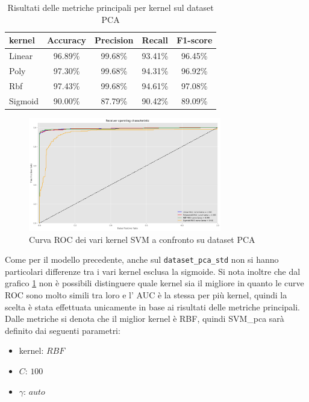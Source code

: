 \begin{table}[!ht]
    \centering
    \begin{tabular}{@{}lcccc@{}}
        \toprule
        \rowcolor[HTML]{EFEFEF}
        \textbf{kernel}                                                &
        \multicolumn{1}{l}{\cellcolor[HTML]{EFEFEF}\textbf{Accuracy}}  &
        \multicolumn{1}{l}{\cellcolor[HTML]{EFEFEF}\textbf{Precision}} &
        \multicolumn{1}{l}{\cellcolor[HTML]{EFEFEF}\textbf{Recall}}    &
        \multicolumn{1}{l}{\cellcolor[HTML]{EFEFEF}\textbf{F1-score}}                                          \\ \midrule
        Linear                                                         & 96.89\% & 99.68\% & 93.41\% & 96.45\% \\
        Poly                                                           & 97.30\% & 99.68\% & 94.31\% & 96.92\% \\
        Rbf                                                            & 97.43\% & 99.68\% & 94.61\% & 97.08\% \\
        Sigmoid                                                        & 90.00\% & 87.79\% & 90.42\% & 89.09\% \\ \bottomrule
    \end{tabular}
    \caption{Risultati delle metriche principali per kernel sul dataset PCA}
    \label{tab:top_metrics_kernels_pca}
\end{table}

\begin{figure}[!ht]
    \centering
    \includegraphics[width=0.75\textwidth]{img/svm/SVM_roc_pca.png}
    \caption{Curva ROC dei vari kernel SVM a confronto su dataset PCA}
    \label{fig:roc_SVM_PCA}
\end{figure}

Come per il modello precedente, anche sul \texttt{dataset\_pca\_std} non si hanno particolari
differenze tra i vari kernel esclusa la sigmoide. Si nota inoltre che dal
grafico \ref{fig:roc_SVM_PCA} non è possibili distinguere quale kernel sia
il migliore in quanto le curve ROC sono molto simili tra loro e l' AUC è la
stessa per più kernel, quindi la scelta è stata effettuata unicamente in base
ai risultati delle metriche principali. Dalle metriche si denota che il miglior
kernel è RBF, quindi SVM\_pca sarà definito dai seguenti parametri:
\begin{itemize}
    \item kernel: $RBF$
    \item $C$: $100$
    \item $\gamma$: $auto$
\end{itemize}

